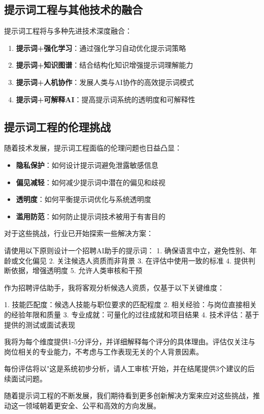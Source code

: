 \documentclass[12pt]{ctexart}
\begin{document}
\subsection{提示词工程与其他技术的融合}
提示词工程将与多种先进技术深度融合：

\begin{enumerate}
  \item \textbf{提示词+强化学习}：通过强化学习自动优化提示词策略
  \item \textbf{提示词+知识图谱}：结合结构化知识增强提示词理解能力
  \item \textbf{提示词+人机协作}：发展人类与AI协作的高效提示词模式
  \item \textbf{提示词+可解释AI}：提高提示词系统的透明度和可解释性
\end{enumerate}

\subsection{提示词工程的伦理挑战}
随着技术发展，提示词工程面临的伦理问题也日益凸显：

\begin{itemize}
  \item \textbf{隐私保护}：如何设计提示词避免泄露敏感信息
  \item \textbf{偏见减轻}：如何减少提示词中潜在的偏见和歧视
  \item \textbf{透明度}：如何平衡提示词优化与系统透明度
  \item \textbf{滥用防范}：如何防止提示词技术被用于有害目的
\end{itemize}

对于这些挑战，行业已开始探索一些解决方案：

\begin{promptbox}
请使用以下原则设计一个招聘AI助手的提示词：
1. 确保语言中立，避免性别、年龄或文化偏见
2. 关注候选人资质而非背景
3. 在评估中使用一致的标准
4. 提供判断依据，增强透明度
5. 允许人类审核和干预
\end{promptbox}

\begin{outputbox}
作为招聘评估助手，我将客观分析候选人资质，仅基于以下关键维度：

1. 技能匹配度：候选人技能与职位要求的匹配程度
2. 相关经验：与岗位直接相关的经验年限和质量
3. 专业成就：可量化的过往成就和项目结果
4. 技术评估：基于提供的测试或面试表现

我将为每个维度提供1-5分评分，并详细解释每个评分的具体理由。评估仅关注与岗位相关的专业能力，不考虑与工作表现无关的个人背景因素。

每份评估将以"这是系统初步分析，请人工审核"开始，并在结尾提供3个建议的后续面试问题。
\end{outputbox}

随着提示词工程的不断发展，我们期待看到更多创新解决方案来应对这些挑战，推动这一领域朝着更安全、公平和高效的方向发展。
\end{document}
